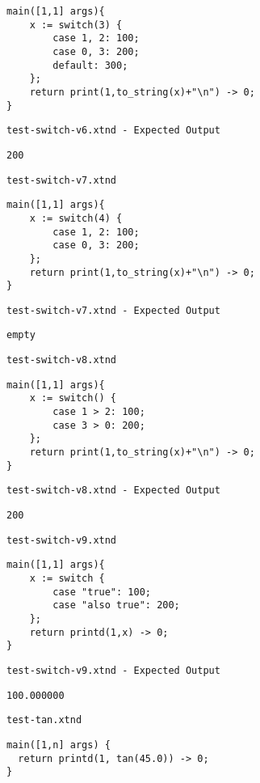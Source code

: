 \begin{lstlisting}
main([1,1] args){
	x := switch(3) {
		case 1, 2: 100;
		case 0, 3: 200;
		default: 300;
	};
	return print(1,to_string(x)+"\n") -> 0;
}
\end{lstlisting}


\medskip \noindent \texttt{test-switch-v6.xtnd - Expected Output}


\begin{lstlisting}
200
\end{lstlisting}


\medskip \noindent \texttt{test-switch-v7.xtnd}


\begin{lstlisting}
main([1,1] args){
	x := switch(4) {
		case 1, 2: 100;
		case 0, 3: 200;
	};
	return print(1,to_string(x)+"\n") -> 0;
}
\end{lstlisting}


\medskip \noindent \texttt{test-switch-v7.xtnd - Expected Output}


\begin{lstlisting}
empty
\end{lstlisting}


\medskip \noindent \texttt{test-switch-v8.xtnd}


\begin{lstlisting}
main([1,1] args){
	x := switch() {
		case 1 > 2: 100;
		case 3 > 0: 200;
	};
	return print(1,to_string(x)+"\n") -> 0;
}
\end{lstlisting}


\medskip \noindent \texttt{test-switch-v8.xtnd - Expected Output}


\begin{lstlisting}
200
\end{lstlisting}


\medskip \noindent \texttt{test-switch-v9.xtnd}


\begin{lstlisting}
main([1,1] args){
	x := switch {
		case "true": 100;
		case "also true": 200;
	};
	return printd(1,x) -> 0;
}
\end{lstlisting}


\medskip \noindent \texttt{test-switch-v9.xtnd - Expected Output}


\begin{lstlisting}
100.000000
\end{lstlisting}


\medskip \noindent \texttt{test-tan.xtnd}


\begin{lstlisting}
main([1,n] args) {
  return printd(1, tan(45.0)) -> 0;
}
\end{lstlisting}



